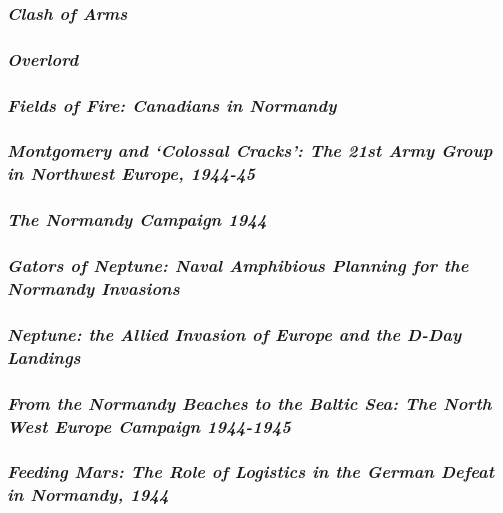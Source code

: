 \documentclass[noraggedright]{turabian-researchpaper}
\begin{document}

		\subsubsection{\textit{Clash of Arms}}
		\subsubsection{\textit{Overlord}}
		\subsubsection{\textit{Fields of Fire:  Canadians in 
			Normandy}}

			
		\subsubsection{\textit{Montgomery and `Colossal Cracks':  
			The 21st Army Group in Northwest Europe, 1944-45}}
		\subsubsection{\textit{The Normandy Campaign 1944}}
		\subsubsection{\textit{Gators of Neptune: Naval Amphibious
			Planning for the Normandy Invasions}}
		\subsubsection{\textit{Neptune:  the Allied Invasion of 
			Europe and the D-Day Landings}}
		\subsubsection{\textit{From the Normandy Beaches to the 
			Baltic Sea: The North West Europe Campaign
			1944-1945}}
		\subsubsection{\textit{Feeding Mars:  The Role of Logistics
			in the German Defeat in Normandy, 1944}}
\end{document}
